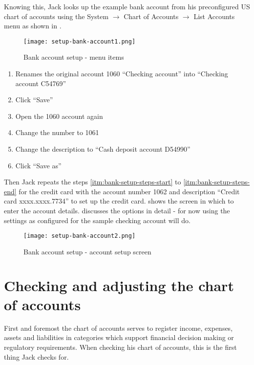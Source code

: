 Knowing this, Jack looks up the example bank account from his preconfigured US chart of
accounts using the System $\rightarrow$ Chart of Accounts $\rightarrow$ List Accounts menu as
shown in .

\begin{figure}[h]
\texttt{[image: setup-bank-account1.png]}
\caption{Bank account setup - menu items}
\label{fig:bank-setup1}
\end{figure}



\begin{enumerate}
\item Renames the original account 1060 ``Checking account'' into ``Checking account C54769''
\item Click ``Save''
\item Open the 1060 account again
\label{itm:bank-setup-steps-start}
\item Change the number to 1061
\item Change the description to ``Cash deposit account D54990''
\item Click ``Save as''
\label{itm:bank-setup-steps-end}
\end{enumerate}

Then Jack repeats the steps \ref{itm:bank-setup-steps-start} to \ref{itm:bank-setup-steps-end}
for the credit card with the account number 1062 and description ``Credit card xxxx.xxxx.7734'' to set
up the credit card.  shows the screen in which to enter the account
details.  discusses the options in detail - for now using the
settings as configured for the sample checking account will do.

\begin{figure}[h]
\texttt{[image: setup-bank-account2.png]}
\caption{Bank account setup - account setup screen}
\label{fig:bank-setup2}
\end{figure}


\section{Checking and adjusting the chart of accounts}
\label{sec:checking-the-coa}

First and foremost the chart of accounts serves to register income, expenses,
assets and liabilities in categories which support financial decision making or
regulatory requirements. When checking his chart of accounts, this is the first
thing Jack checks for.

